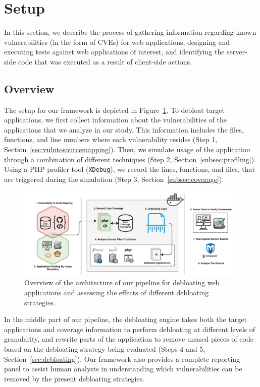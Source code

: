 

\section{Setup}
In this section, we describe the process of gathering information regarding
known vulnerabilities (in the form of CVEs) for web applications, designing
and executing tests against web applications of interest, and identifying
the server-side code that was executed as a result of client-side actions.

\subsection{Overview}
The setup for our framework is depicted in
Figure~\ref{fig:debloatingpipeline}. To debloat target applications, we first
collect information about the vulnerabilities of the applications that we
analyze in our study. This information includes the files, functions, and
line numbers where each
vulnerability resides (Step 1, Section~\ref{sec:vulntosourcemapping}). Then,
we simulate usage of the application through a combination of different
techniques (Step 2, Section~\ref{subsec:profiling}). Using a PHP profiler
tool (\texttt{XDebug}), we record the lines, functions, and files, that are
triggered during the simulation (Step 3, Section~\ref{subsec:coverage}).

\begin{figure}[t]
  \includegraphics[width=\linewidth]{figures/lim/DebloatingPipeline.pdf}
  \caption{Overview of the architecture of our pipeline for debloating web applications and assessing the effects of different debloating strategies.}
  \label{fig:debloatingpipeline}
\end{figure}

In the middle part of our pipeline, the debloating engine takes both the
target applications and coverage information to perform debloating at
different levels of granularity, and rewrite parts of the application to
remove unused pieces of code based on the debloating strategy being evaluated
(Steps 4 and 5, Section~\ref{sec:debloating}). Our framework also provides
a complete reporting panel to assist human analysts in understanding which
vulnerabilities can be removed by the present debloating strategies.

